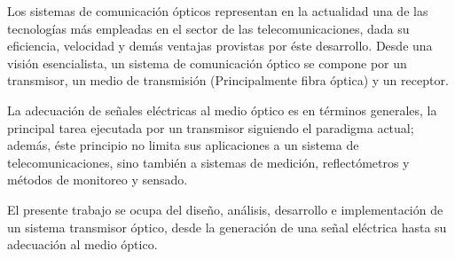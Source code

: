 


\begin{abstracts} 
Los sistemas de comunicación ópticos representan en la actualidad una de las tecnologías más empleadas en el sector de las telecomunicaciones, dada su eficiencia, velocidad y demás ventajas provistas por éste desarrollo. Desde una visión esencialista, un sistema de comunicación óptico se compone por un transmisor, un medio de transmisión (Principalmente fibra óptica) y un receptor.

La adecuación de señales eléctricas al medio óptico es en términos generales, la principal tarea ejecutada por un transmisor siguiendo el paradigma actual; además, éste principio no limita sus aplicaciones a un sistema de telecomunicaciones, sino también a sistemas de medición, reflectómetros y métodos de monitoreo y sensado.

El presente trabajo se ocupa del diseño, análisis, desarrollo e implementación de un sistema transmisor óptico, desde la generación de una señal eléctrica hasta su adecuación al medio óptico.   

\end{abstracts}


